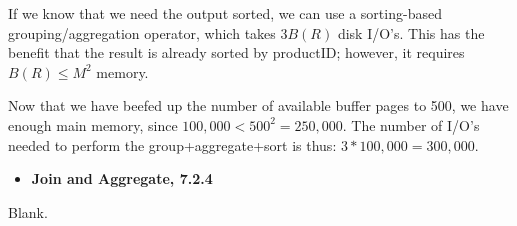 If we know that we need the output sorted, we can use a sorting-based
grouping/aggregation operator, which takes $3 B(R)$ disk I/O's. This has the
benefit that the result is already sorted by productID; however, it requires
$B(R) \leq M^2$ memory.
\medskip

Now that we have beefed up the number of available buffer pages to 500, we have
enough main memory, since $100,000 < 500^2 = 250,000$. The number of I/O's
needed to perform the group+aggregate+sort is thus: $3 * 100,000 = 300,000$.


\begin{itemize}
  \item \textbf{Join and Aggregate, 7.2.4}
\end{itemize}

Blank.

